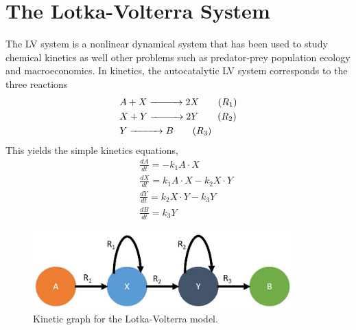 \section{The Lotka-Volterra System}
\label{ch4:sec:lv}
The LV system is a nonlinear dynamical system that has been used to study
chemical kinetics\cite{ch4_31_lotka1910contribution} as well other problems such as predator-prey population ecology\cite{ch4_32_volterra1928variations} and macroeconomics.\cite{ch4_33_feinstein1975socialism} In kinetics,
the autocatalytic LV system corresponds to the three reactions
\begin{align*}
    & A + X \xrightarrow[]{\makebox[1cm]{}} 2X	\tag{$R_1$} \label{ch4:lv:rxn1}\\
    & X + Y \xrightarrow[]{\makebox[1cm]{}} 2Y		\tag{$R_2$} \label{ch4:lv:rxn2}\\
    & Y \xrightarrow[]{\makebox[1cm]{}} B				\tag{$R_3$} \label{ch4:lv:rxn3}
\end{align*}
This yields the simple kinetics equations,
\begin{eqnarray}
    && \frac{dA}{dt} = -k_1 A \cdot X			\label{ch4:eqn18} \\
    && \frac{dX}{dt} = k_1 A \cdot X - k_2 X \cdot Y	\label{ch4:eqn19} \\
    && \frac{dY}{dt} = k_2 X \cdot Y - k_3 Y		\label{ch4:eqn20} \\
    && \frac{dB}{dt} = k_3 Y				\label{ch4:eqn21}
\end{eqnarray}
\begin{figure}[htbp]
	\caption[Kinetic graph for the Lotka-Volterra model]{Kinetic graph for the Lotka-Volterra model.}
    \begin{center}
	\includegraphics[width=100mm]{figs/chapter4/fig2.jpg}
    \end{center}
\label{ch4:fig:2}
\end{figure}
